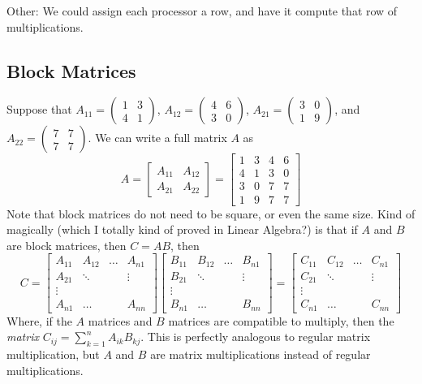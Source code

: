 \documentclass[12pt]{article}
\numberwithin{equation}{section}
\newcommand{\mymatr}[1]{\left(\begin{smallmatrix}#1\end{smallmatrix}\right)} %
\theoremstyle{theorem}
\theoremstyle{definition}
\theoremstyle{remark}
\begin{document}
Other: We could assign each processor a row, and have it compute that row of multiplications.

\subsection{Block Matrices}
Suppose that $A_{11} = \mymatr{1 & 3 \\ 4 & 1}$, $A_{12} = \mymatr{4 & 6 \\ 3 & 0}$, $A_{21} = \mymatr{3 & 0 \\ 1 & 9}$, and $A_{22} = \mymatr{7 & 7 \\ 7 & 7}$.  We can write a full matrix $A$ as
\begin{equation}
A = \begin{bmatrix}A_{11} & A_{12} \\ A_{21} & A_{22}\end{bmatrix} = \begin{bmatrix} 1 & 3 & 4 & 6 \\ 4 & 1 & 3 & 0 \\ 3 & 0 & 7 & 7 \\ 1 & 9 & 7 & 7\end{bmatrix}
\end{equation}
Note that block matrices do not need to be square, or even the same size.  Kind of magically (which I totally kind of proved in Linear Algebra?)  is that if $A$ and $B$ are block matrices, then $C = AB$, then
\begin{equation}
C = \begin{bmatrix} A_{11} & A_{12} & \dots & A_{n1} \\ A_{21} & \ddots & &\vdots \\ \vdots & & & \\ A_{n1} & \dots & & A_{nn}\end{bmatrix} \begin{bmatrix} B_{11} & B_{12} & \dots & B_{n1} \\ B_{21} & \ddots & &\vdots \\ \vdots & & & \\ B_{n1} & \dots & & B_{nn}\end{bmatrix} = \begin{bmatrix} C_{11} & C_{12} & \dots & C_{n1} \\ C_{21} & \ddots & &\vdots \\ \vdots & & & \\ C_{n1} & \dots & & C_{nn}\end{bmatrix}
\end{equation}
Where, if the $A$ matrices and $B$ matrices are compatible to multiply, then the \textit{matrix} $C_{ij} = \sum_{k=1}^n A_{ik}B_{kj}$.  This is perfectly analogous to regular matrix multiplication, but $A$ and $B$ are matrix multiplications instead of regular multiplications.
\end{document}
